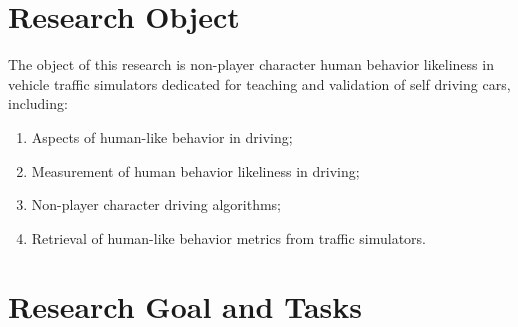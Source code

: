 \documentclass{VUMIFPS-master-intro}
\begin{document}


\section{Research Object}

The object of this research is non-player character human behavior likeliness in vehicle traffic simulators dedicated for teaching and validation of self driving cars, including:
\begin{enumerate}
	\item Aspects of human-like behavior in driving;
	\item Measurement of human behavior likeliness in driving;
	\item Non-player character driving algorithms;
	\item Retrieval of human-like behavior metrics from traffic simulators.
\end{enumerate}


\section{Research Goal and Tasks}

\end{document}
